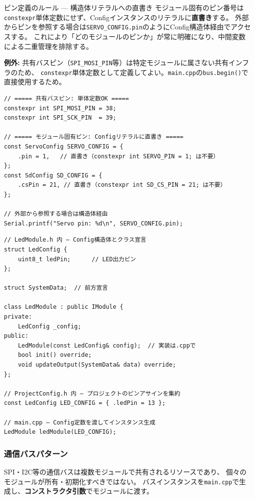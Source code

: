 \begin{funcblock}{ピン定義のルール — 構造体リテラルへの直書き}
モジュール固有のピン番号は\texttt{constexpr}単体定数にせず、Configインスタンスのリテラルに\textbf{直書き}する。
外部からピンを参照する場合は\texttt{SERVO\_CONFIG.pin}のようにConfig構造体経由でアクセスする。
これにより「どのモジュールのピンか」が常に明確になり、中間変数による二重管理を排除する。

\medskip
\textbf{例外:} 共有バスピン（\texttt{SPI\_MOSI\_PIN}等）は特定モジュールに属さない共有インフラのため、
\texttt{constexpr}単体定数として定義してよい。\texttt{main.cpp}の\texttt{bus.begin()}で直接使用するため。

\begin{lstlisting}[style=cppstyle, caption={ピン定義の正しい書き方}]
// ===== 共有バスピン: 単体定数OK =====
constexpr int SPI_MOSI_PIN = 38;
constexpr int SPI_SCK_PIN  = 39;

// ===== モジュール固有ピン: Configリテラルに直書き =====
const ServoConfig SERVO_CONFIG = {
    .pin = 1,   // 直書き（constexpr int SERVO_PIN = 1; は不要）
};
const SdConfig SD_CONFIG = {
    .csPin = 21, // 直書き（constexpr int SD_CS_PIN = 21; は不要）
};

// 外部から参照する場合は構造体経由
Serial.printf("Servo pin: %d\n", SERVO_CONFIG.pin);
\end{lstlisting}
\end{funcblock}

\begin{lstlisting}[style=cppstyle, caption={モジュールConfigパターンの例}]
// LedModule.h 内 — Config構造体とクラス宣言
struct LedConfig {
    uint8_t ledPin;      // LED出力ピン
};

struct SystemData;  // 前方宣言

class LedModule : public IModule {
private:
    LedConfig _config;
public:
    LedModule(const LedConfig& config);  // 実装は.cppで
    bool init() override;
    void updateOutput(SystemData& data) override;
};

// ProjectConfig.h 内 — プロジェクトのピンアサインを集約
const LedConfig LED_CONFIG = { .ledPin = 13 };

// main.cpp — Config定数を渡してインスタンス生成
LedModule ledModule(LED_CONFIG);
\end{lstlisting}

\subsubsection{通信バスパターン}
SPI・I2C等の通信バスは複数モジュールで共有されるリソースであり、
個々のモジュールが所有・初期化すべきではない。
バスインスタンスを\texttt{main.cpp}で生成し、\textbf{コンストラクタ引数}でモジュールに渡す。

